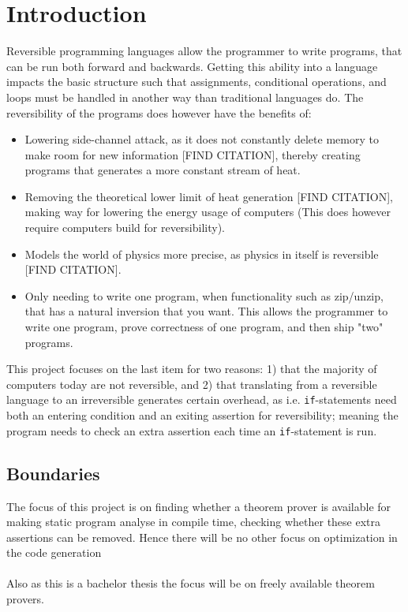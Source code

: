 \section{Introduction}
Reversible programming languages allow the programmer to write programs, that can be run
both forward and backwards. Getting this ability into a language impacts the basic structure
such that assignments, conditional operations, and loops must be handled in another way
than traditional languages do. The reversibility of the programs does however have the benefits
of:

\begin{itemize}
    \item Lowering side-channel attack, as it does not constantly delete memory to make room for
    new information [FIND CITATION], thereby creating programs that generates a more constant
    stream of heat.

    \item Removing the theoretical lower limit of heat generation [FIND CITATION], making way
    for lowering the energy usage of computers (This does however require computers build
    for reversibility).

    \item Models the world of physics more precise, as physics in itself is reversible
    [FIND CITATION].

    \item Only needing to write one program, when functionality such as zip/unzip, that has
    a natural inversion that you want. This allows the programmer to write one program, prove
    correctness of one program, and then ship "two" programs.
\end{itemize}
\noindent
This project focuses on the last item for two reasons: 1) that the majority of computers today are
not reversible, and 2) that translating from a reversible language to an irreversible
generates certain overhead, as i.e. \texttt{if}-statements need both an entering condition and an
exiting assertion for reversibility; meaning the program needs to check an extra assertion each
time an \texttt{if}-statement is run.


\subsection{Boundaries}
The focus of this project is on finding whether a theorem prover is available for making static
program analyse in compile time, checking whether these extra assertions can be removed. Hence
there will be no other focus on optimization in the code generation
\\
\\
Also as this is a bachelor thesis the focus will be on freely available theorem provers.